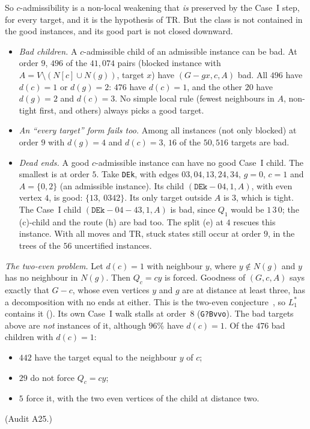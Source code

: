 \documentclass[11pt]{amsart}
\theoremstyle{definition}
\newcommand{\TR}{\mathrm{TR}}
\begin{document}
So $c$-admissibility is a non-local weakening that \emph{is} preserved by the Case~I step, for every
target, and it is the hypothesis of $\TR$. But the class is not contained in the good instances,
and its good part is not closed downward.
\begin{itemize}
\item \emph{Bad children.} A $c$-admissible child of an admissible instance can be bad. At order $9$,
$496$ of the $41{,}074$ pairs (blocked instance with $A=V\setminus(N[c]\cup N(g))$, target $x$) have
$(G-gx,c,A)$ bad. All $496$ have $d(c)=1$ or $d(g)=2$: $476$ have $d(c)=1$, and the other $20$ have
$d(g)=2$ and $d(c)=3$. No simple local rule (fewest neighbours in $A$, non-tight first, and others)
always picks a good target.
\item \emph{An ``every target'' form fails too.} Among all instances (not only blocked) at order $9$
with $d(g)=4$ and $d(c)=3$, $16$ of the $50{,}516$ targets are bad.
\item \emph{Dead ends.} A good $c$-admissible instance can have no good Case~I child. The smallest is
at order $5$. Take \texttt{DEk}, with edges $03,04,13,24,34$, $g=0$, $c=1$ and $A=\{0,2\}$ (an
admissible instance). Its child $(\texttt{DEk}-04,1,A)$, with even vertex $4$, is good:
$\{13,\ 0342\}$. Its only target outside $A$ is $3$, which is tight. The Case~I child
$(\texttt{DEk}-04-43,1,A)$ is bad, since $Q_1$ would be $1\,3\,0$; the (c)-child and the route (h)
are bad too. The split (e) at $4$ rescues this instance. With all moves and $\TR$, stuck states still
occur at order $9$, in the trees of the $56$ uncertified instances.
\end{itemize}

\emph{The two-even problem.} Let $d(c)=1$ with neighbour $y$, where $y\notin N(g)$ and $y$ has no
neighbour in $N(g)$. Then $Q_c=cy$ is forced. Goodness of $(G,c,A)$ says exactly that $G-c$, whose
even vertices $y$ and $g$ are at distance at least three, has a decomposition with no ends at
either. This is the two-even conjecture~\cite[Conj.~3.2]{L1S}, so $L_1^*$ contains it
(\cite[Prop.~3.3]{L1S}). Its own Case~I walk stalls at order~$8$ (\texttt{G?Bvvo}). The bad targets
above are \emph{not} instances of it, although $96\%$ have $d(c)=1$. Of the $476$ bad children with
$d(c)=1$:
\begin{itemize}
\item $442$ have the target equal to the neighbour $y$ of $c$;
\item $29$ do not force $Q_c=cy$;
\item $5$ force it, with the two even vertices of the child at distance two.
\end{itemize}
(Audit A25.)
\end{document}
